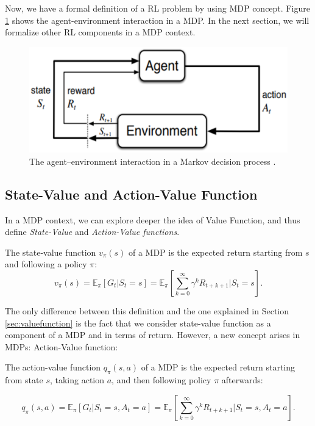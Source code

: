 Now, we have a formal definition of a RL problem by using MDP concept. Figure \ref{fig:mdprlsystem} shows the agent-environment interaction in a MDP. In the next section, we will formalize other RL components in a MDP context.

\begin{figure}[ht!]
	\centering
	\includegraphics[scale=0.5]{Cap4/mdprlsystem.eps}
	\caption{The agent–environment interaction in a Markov decision process \cite{sutton1998rli}.}
	\label{fig:mdprlsystem}
\end{figure}

\subsection{State-Value and Action-Value Function}

In a MDP context, we can explore deeper the idea of Value Function, and thus define \textit{State-Value} and \textit{Action-Value functions}.

\begin{definition}\label{def:statevalue}
	The state-value function $v_{\pi}(s)$ of a MDP is the expected return starting from $s$ and following a policy $\pi$:
	\begin{equation}
	v_{\pi}(s) = \mathbb{E}_{\pi} [G_{t} \big| S_{t} = s] = \mathbb{E}_{\pi} \left[ \sum_{k = 0}^{\infty} \gamma^{k} R_{t + k + 1} \Bigg| S_{t} = s \right]  .
	\end{equation}
\end{definition}

The only difference between this definition and the one explained in Section \ref{sec:valuefunction} is the fact that we consider state-value function as a component of a MDP and in terms of return. However, a new concept arises in MDPs: Action-Value function:

\begin{definition}\label{def:actionvalue}
	The action-value function $q_{\pi}(s,a)$ of a MDP is the expected return starting from state $s$, taking action $a$, and then following policy $\pi$ afterwards:
	
	\begin{equation}
	q_{\pi}(s,a) = \mathbb{E}_{\pi} [G_{t} | S_{t} = s, A_{t} = a] = \mathbb{E}_{\pi} \left[ \sum_{k = 0}^{\infty} \gamma^{k} R_{t + k + 1} \Bigg| S_{t} = s, A_{t} = a \right]. 
	\end{equation}
\end{definition}


